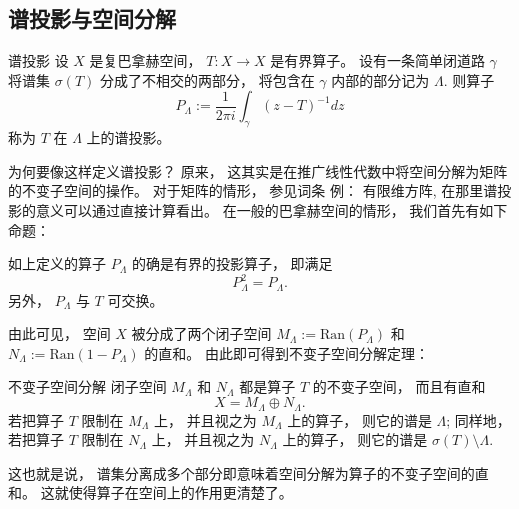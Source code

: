 

\subsection{谱投影与空间分解}
\begin{definition}{谱投影}
设 $X$ 是复巴拿赫空间， $T:X\to X$ 是有界算子。 设有一条简单闭道路 $\gamma$ 将谱集 $\sigma(T)$ 分成了不相交的两部分， 将包含在 $\gamma$ 内部的部分记为 $\Lambda$. 则算子
$$
P_\Lambda:=\frac{1}{2\pi i}\int_\gamma(z-T)^{-1}dz
$$
称为 $T$ 在 $\Lambda$ 上的谱投影。
\end{definition}

为何要像这样定义谱投影？ 原来， 这其实是在推广线性代数中将空间分解为矩阵的不变子空间的操作。 对于矩阵的情形， 参见词条 例： 有限维方阵, 在那里谱投影的意义可以通过直接计算看出。 在一般的巴拿赫空间的情形， 我们首先有如下命题：

\begin{lemma}{}
如上定义的算子 $P_\Lambda$ 的确是有界的投影算子， 即满足
$$
P_\Lambda^2=P_\Lambda.
$$
另外， $P_\Lambda$ 与 $T$ 可交换。
\end{lemma}

由此可见， 空间 $X$ 被分成了两个闭子空间 $M_\Lambda:=\text{Ran}(P_\Lambda)$ 和 $N_\Lambda:=\text{Ran}(1-P_\Lambda)$ 的直和。 由此即可得到不变子空间分解定理：

\begin{theorem}{不变子空间分解}
闭子空间 $M_\Lambda$ 和 $N_\Lambda$ 都是算子 $T$ 的不变子空间， 而且有直和
$$
X=M_\Lambda\oplus N_\Lambda.
$$
若把算子 $T$ 限制在 $M_\Lambda$ 上， 并且视之为 $M_\Lambda$ 上的算子， 则它的谱是 $\Lambda$; 同样地， 若把算子 $T$ 限制在 $N_\Lambda$ 上， 并且视之为 $N_\Lambda$ 上的算子， 则它的谱是 $\sigma(T)\setminus\Lambda$.
\end{theorem}

这也就是说， 谱集分离成多个部分即意味着空间分解为算子的不变子空间的直和。 这就使得算子在空间上的作用更清楚了。

